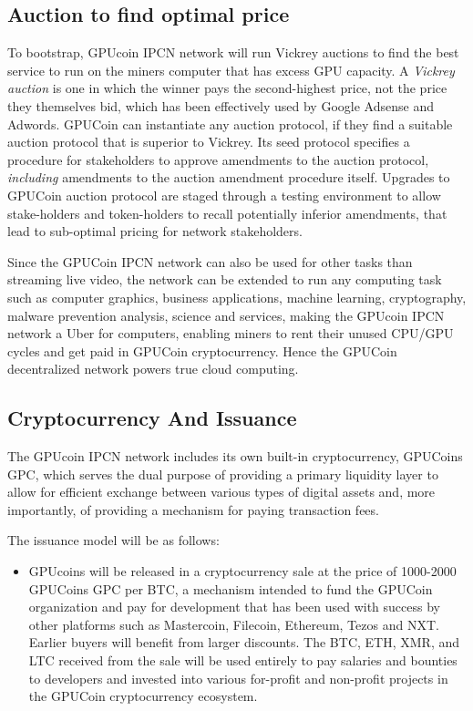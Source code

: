 \documentclass{article}
\begin{document}
\subsection{Auction to find optimal price}
To bootstrap, GPUcoin IPCN network will run Vickrey auctions to find the best service to run on the miners computer that has excess GPU capacity. A \emph{Vickrey auction} is one in which the winner pays the second-highest price, not the price they themselves bid, which has been effectively used by Google Adsense and Adwords.
GPUCoin can instantiate any auction protocol, if they find a suitable auction protocol that is superior to Vickrey. Its seed protocol specifies a procedure for stakeholders to approve amendments to the auction protocol,
\emph{including} amendments to the auction amendment procedure itself. Upgrades to GPUCoin auction protocol are staged through a testing environment to allow stake-holders and token-holders to recall potentially inferior amendments, that lead to sub-optimal pricing for network stakeholders. 

Since the GPUCoin IPCN network can also be used for other tasks than streaming live video, the network can be extended to run any computing task such as computer graphics, business applications, machine learning, cryptography, malware prevention analysis, science and services, making the GPUcoin IPCN network a Uber for computers, enabling miners to rent their unused CPU/GPU cycles and get paid in GPUCoin cryptocurrency. Hence the GPUCoin decentralized network powers true cloud computing.

\subsection{Cryptocurrency And Issuance}

The GPUcoin IPCN network includes its own built-in cryptocurrency, GPUCoins GPC, which serves the dual purpose of providing a primary liquidity layer to allow for efficient exchange between various types of digital assets and, more importantly, of providing a mechanism for paying transaction fees.

The issuance model will be as follows:

\begin{itemize}

\item GPUcoins will be released in a cryptocurrency sale at the price of 1000-2000 GPUCoins GPC per BTC, a mechanism intended to fund the GPUCoin organization and pay for development that has been used with success by other platforms such as Mastercoin, Filecoin, Ethereum, Tezos and NXT. Earlier buyers will benefit from larger discounts. The BTC, ETH, XMR, and LTC received from the sale will be used entirely to pay salaries and bounties to developers and invested into various for-profit and non-profit projects in the GPUCoin cryptocurrency ecosystem.

\end{itemize}
\end{document}
